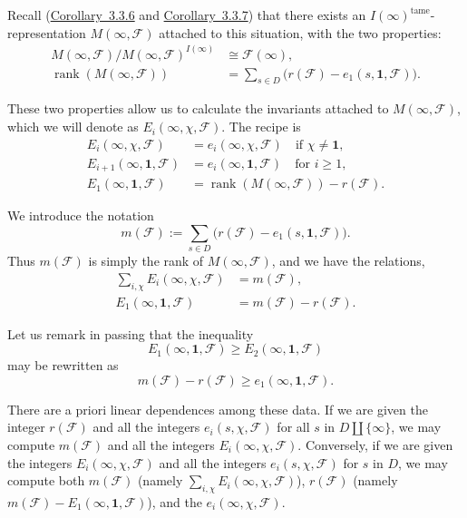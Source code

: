 Recall (\hyperref[cor:3.3.6]{Corollary~3.3.6} and \hyperref[cor:3.3.7]{Corollary~3.3.7}) that there exists an \(I(\infty)^{\mathrm{tame}}\)-representation \(M(\infty,\mathcal{F})\) attached to this situation, with the two properties:
\[
\begin{aligned}
M(\infty,\mathcal{F})/M(\infty,\mathcal{F})^{I(\infty)}&\cong \mathcal{F}(\infty),\\
\operatorname{rank}(M(\infty,\mathcal{F}))&=\sum_{s\in D}\bigl(r(\mathcal{F})-e_1(s,\mathbf{1},\mathcal{F})\bigr).
\end{aligned}
\]

These two properties allow us to calculate the invariants attached to \(M(\infty,\mathcal{F})\), which we will denote as \(E_i(\infty,\chi,\mathcal{F})\). The recipe is
\[
\begin{aligned}
E_i(\infty,\chi,\mathcal{F})&=e_i(\infty,\chi,\mathcal{F})\quad\text{if }\chi\ne\mathbf{1},\\
E_{i+1}(\infty,\mathbf{1},\mathcal{F})&=e_i(\infty,\mathbf{1},\mathcal{F})\quad\text{for }i\geq 1,\\
E_1(\infty,\mathbf{1},\mathcal{F})&=\operatorname{rank}(M(\infty,\mathcal{F}))-r(\mathcal{F}).
\end{aligned}
\]

We introduce the notation
\[
m(\mathcal{F}) := \sum_{s\in D}\bigl(r(\mathcal{F})-e_1(s,\mathbf{1},\mathcal{F})\bigr).
\]
Thus \(m(\mathcal{F})\) is simply the rank of \(M(\infty,\mathcal{F})\), and we have the relations,
\[
\begin{aligned}
\sum_{i,\chi} E_i(\infty,\chi,\mathcal{F})&=m(\mathcal{F}),\\
E_1(\infty,\mathbf{1},\mathcal{F})&=m(\mathcal{F})-r(\mathcal{F}).
\end{aligned}
\]

Let us remark in passing that the inequality
\[
E_1(\infty,\mathbf{1},\mathcal{F})\geq E_2(\infty,\mathbf{1},\mathcal{F})
\]
may be rewritten as
\[
m(\mathcal{F})-r(\mathcal{F})\geq e_1(\infty,\mathbf{1},\mathcal{F}).
\]

There are a priori linear dependences among these data. If we are given the integer \(r(\mathcal{F})\) and all the integers \(e_i(s,\chi,\mathcal{F})\) for all \(s\) in \(D\amalg\{\infty\}\), we may compute \(m(\mathcal{F})\) and all the integers \(E_i(\infty,\chi,\mathcal{F})\). Conversely, if we are given the integers \(E_i(\infty,\chi,\mathcal{F})\) and all the integers \(e_i(s,\chi,\mathcal{F})\) for \(s\) in \(D\), we may compute both \(m(\mathcal{F})\) (namely \(\sum_{i,\chi}E_i(\infty,\chi,\mathcal{F})\)), \(r(\mathcal{F})\) (namely \(m(\mathcal{F})-E_1(\infty,\mathbf{1},\mathcal{F})\)), and the \(e_i(\infty,\chi,\mathcal{F})\).

